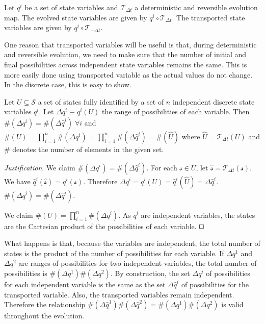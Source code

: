 \documentclass[smallextended]{svjour3}
\numberwithin{equation}{section}
\newenvironment{justification}{\emph{Justification}.}{\hfill\(\qed\)}
\begin{document}
\begin{prop}\label{prop:evolved_transported_variable}
Let $q^i$ be a set of state variables and $\mathcal{T}_{\Delta t}$ a deterministic and reversible evolution map. The evolved state variables are given by $q^i \circ \mathcal{T}_{\Delta t}$. The transported state variables are given by $q^i \circ \mathcal{T}_{-\Delta t}$.
\end{prop}

One reason that transported variables will be useful is that, during deterministic and reversible evolution, we need to make sure that the number of initial and final possibilities across independent state variables remains the same. This is more easily done using transported variable as the actual values do not change. In the discrete case, this is easy to show.

\begin{prop}\label{prop:discrete_measure}
	Let $U \subseteq \mathcal{S}$ a set of states fully identified by a set of $n$ independent discrete state variables $q^i$. Let $\Delta q^i \equiv q^i(U)$ the range of possibilities of each variable. Then $\#(\Delta q^i)=\#(\Delta \hat{q}^i) \; \forall i$ and $\#(U)=\prod\limits_{i=1}^{n}\#(\Delta q^i)=\prod\limits_{i=1}^{n}\#(\Delta \hat{q}^i)=\#(\hat{U})$ where $\hat{U}=\mathcal{T}_{\Delta t}(U)$ and $\#$ denotes the number of elements in the given set.
\end{prop}

\begin{justification}
	We claim $\#(\Delta q^i)=\#(\Delta \hat{q}^i)$. For each $\mathcal{s} \in U$, let $\hat{\mathcal{s}}=\mathcal{T}_{\Delta t}(\mathcal{s})$. We have $\hat{q}^i(\hat{\mathcal{s}}) = q^i(\mathcal{s})$. Therefore $\Delta q^i = q^i(U) = \hat{q}^i(\hat{U})=\Delta \hat{q}^i$. $\#(\Delta q^i)=\#(\Delta \hat{q}^i)$.
	
	We claim $\#(U)=\prod\limits_{i=1}^{n}\#(\Delta q^i)$. As $q^i$ are independent variables, the states are the Cartesian product of the possibilities of each variable.
\end{justification}

What happens is that, because the variables are independent, the total number of states is the product of the number of possibilities for each variable. If $\Delta q^1$ and $\Delta q^2$ are ranges of possibilities for two independent variables, the total number of possibilities is $\#(\Delta q^1) \#(\Delta q^2)$. By construction, the set $\Delta q^i$ of possibilities for each independent variable is the same as the set $\Delta \hat{q}^i$ of possibilities for the transported variable. Also, the transported variables remain independent. Therefore the relationship $\#(\Delta \hat{q}^1) \#(\Delta \hat{q}^2) = \#(\Delta q^1) \#(\Delta q^2)$ is valid throughout the evolution.
\end{document}
